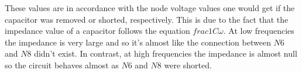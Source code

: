 These values are in accordance with the node voltage values one would get if the capacitor was removed or shorted, respectively. This is due to the fact that the impedance value of a capacitor follows the equation $frac{1}{C\omega}$. At low frequencies the impedance is very large and so it's almost like the connection between $N6$ and $N8$ didn't exist. In contrast, at high frequencies the impedance is almost null so the circuit behaves almost as $N6$ and $N8$ were shorted.






